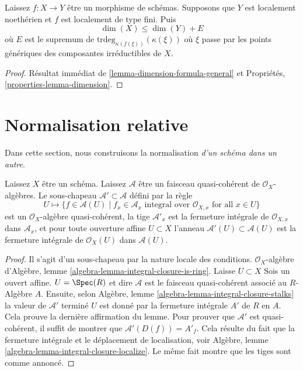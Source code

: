 \begin{lemma}

\label{lemma-alteration-dimension-general}
Laissez $f : X \to Y$ être un morphisme de schémas. Supposons que $Y$ est localement noethérien et $f$ est localement de type fini. Puis $$
\dim(X) \leq \dim(Y) + E
$$ où $E$ est le supremum de $\text{trdeg}_{\kappa(f(\xi))}(\kappa(\xi))$ où $\xi$ passe par les points génériques des composantes irréductibles de $X$.
\end{lemma}

\begin{proof}
Résultat immédiat de \ref{lemma-dimension-formula-general} et Propriétés, \ref{properties-lemma-dimension}.
\end{proof}








\section{Normalisation relative}
\label{section-normalization-X-in-Y}

\noindent
Dans cette section, nous construisons la normalisation {\it d'un schéma dans un autre}.

\begin{lemma}

\label{lemma-integral-closure}
Laissez $X$ être un schéma. Laissez $\mathcal{A}$ être un faisceau quasi-cohérent de $\mathcal{O}_X$-algèbres. Le sous-chapeau $\mathcal{A}' \subset \mathcal{A}$ défini par la règle $$
U \longmapsto \{f \in \mathcal{A}(U) \mid
f_x \in \mathcal{A}_x \text{ integral over } \mathcal{O}_{X, x}
\text{ for all }x \in U\}
$$ est un $\mathcal{O}_X$-algèbre quasi-cohérent, la tige $\mathcal{A}'_x$ est la fermeture intégrale de $\mathcal{O}_{X, x}$ dans $\mathcal{A}_x$, et pour toute ouverture affine $U \subset X$ l'anneau $\mathcal{A}'(U) \subset \mathcal{A}(U)$ est la fermeture intégrale de $\mathcal{O}_X(U)$ dans $\mathcal{A}(U)$.
\end{lemma}

\begin{proof}

Il s'agit d'un sous-chapeau par la nature locale des conditions. $\mathcal{O}_X$-algèbre d'Algèbre, lemme \ref{algebra-lemma-integral-closure-is-ring}. Laisse $U \subset X$ Sois un ouvert affine. $U = \Spec(R)$
et dire $\mathcal{A}$ est le faisceau quasi-cohérent associé au $R$-Algèbre $A$. Ensuite, selon Algèbre, lemme \ref{algebra-lemma-integral-closure-stalks}
la valeur de $\mathcal{A}'$ terminé $U$ est donné par la fermeture intégrale $A'$ de $R$ en $A$. Cela prouve la dernière affirmation du lemme. Pour prouver que $\mathcal{A}'$ est quasi-cohérent, il suffit de montrer que $\mathcal{A}'(D(f)) = A'_f$. Cela résulte du fait que la fermeture intégrale et le déplacement de localisation, voir Algèbre, lemme \ref{algebra-lemma-integral-closure-localize}. Le même fait montre que les tiges sont comme annoncé.

\end{proof}

